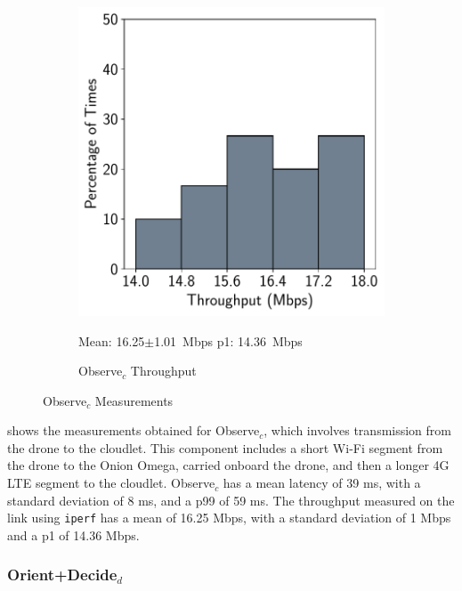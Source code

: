 \begin{figure}[htbp]
\begin{subfigure}[t]{0.45\textwidth}
    \centerline{\includegraphics[width = .8\textwidth]{figs/observe-c-throughput.pdf}}
    \centering
    \small{Mean: 16.25$\pm$1.01~Mbps\; p1: 14.36~Mbps}\\
    \caption{Observe$_{c}$ Throughput}
    \label{fig:observe_c_throughput}
\end{subfigure}
    \caption{Observe$_{c}$ Measurements}
    \label{fig:observe_c_measurements}
\end{figure}

 shows the measurements obtained for
Observe$_c$, which involves transmission from the drone to the cloudlet. This
component includes a short Wi-Fi segment from the drone to the Onion Omega,
carried onboard the drone, and then a longer 4G LTE segment to the cloudlet.
Observe$_c$ has a mean latency of 39 ms, with a standard deviation of 8 ms, and
a p99 of 59 ms. The throughput measured on the link using \texttt{iperf} has a
mean of 16.25 Mbps, with a standard deviation of 1 Mbps and a p1 of 14.36 Mbps.

\subsubsection{\texorpdfstring{Orient+Decide$_d$}{Orient+Decide\_d}}
\label{sec:onion-orient-decide-d}

